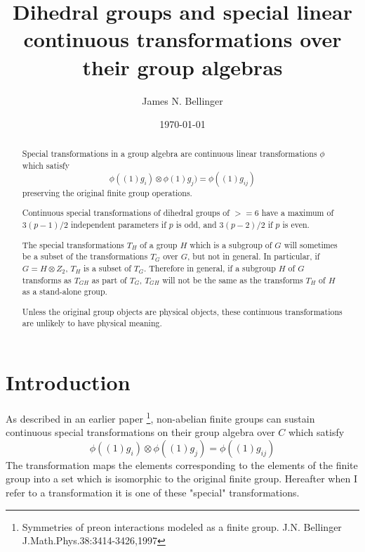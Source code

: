 \documentclass{revtex4-1}
\begin{document}
\title{ Dihedral groups and special linear continuous transformations over their group algebras}
\author{James N. Bellinger}
\date{\today}


\begin{abstract}

Special transformations in a group algebra are continuous linear transformations $\phi$ which satisfy
$$\phi((1)g_i) \otimes \phi(1)g_j) = \phi((1)g_{ij})$$
preserving the original finite group operations.

Continuous special transformations of dihedral groups of $>=6$ have a maximum of $3(p-1)/2$ independent parameters if $p$ 
is odd, and $3(p-2)/2$ if $p$ is even.

\par The special transformations $T_H$ of a group $H$ which is a subgroup of $G$ 
will sometimes be a subset of the transformations $T_G$ over $G$,
but not in general.  In particular, if $G = H \otimes Z_2$, $T_H$
is a subset of $T_G$.  Therefore in general, if a subgroup $H$ of $G$
transforms as $T_{GH}$ as part of $T_G$, $T_{GH}$ will not be the same as
the transforms $T_H$ of $H$ as a stand-alone group.
\par Unless the original group objects are physical objects,
these continuous transformations are unlikely to have physical meaning.
\end{abstract}
\maketitle


\section{Introduction}
As described in an earlier paper \footnote{Symmetries of preon interactions modeled as a finite group. 
J.N. Bellinger J.Math.Phys.38:3414-3426,1997}, non-abelian finite groups can sustain
continuous special transformations on their group algebra over $C$ which satisfy
$$\phi((1)g_i) \otimes \phi((1)g_j) = \phi((1)g_{ij})$$
The transformation maps the 
elements corresponding to the elements of the finite group into a set which
is isomorphic to the original finite group.
Hereafter when I refer to a transformation it is one of these "special" transformations.
\end{document}
